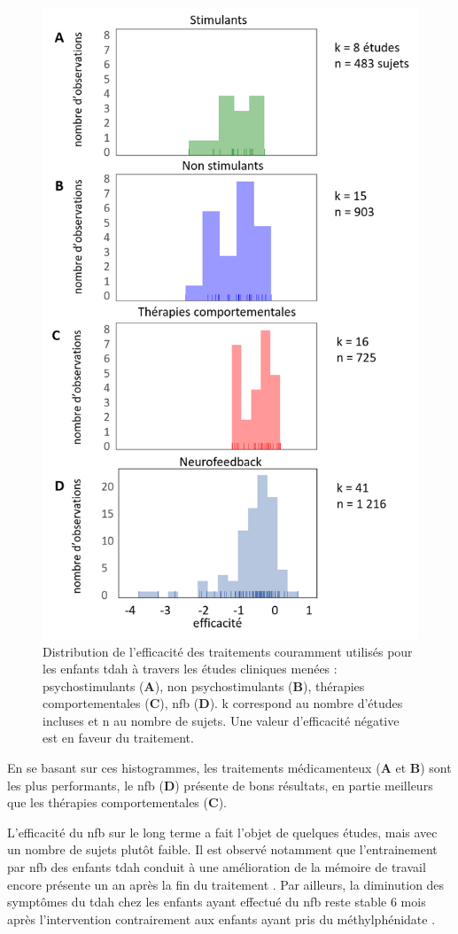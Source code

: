 \begin{figure}[h!]
  \centering
	\includegraphics[width=0.5\linewidth]{figures/chapter-1/introduction-efficacy-treatments} 
  \caption{Distribution de l'efficacité des traitements couramment utilisés pour les enfants \gls{tdah} à travers les études cliniques menées : 
	psychostimulants (\textbf{A}), non psychostimulants (\textbf{B}), thérapies comportementales (\textbf{C}), \gls{nfb} (\textbf{D}). k correspond au nombre
	d'études incluses et n au nombre de sujets. 
	Une valeur d'efficacité négative est en faveur du traitement.}
  \label{Figure:introduction-efficacy-treatments}
\end{figure}

En se basant sur ces histogrammes, les traitements médicamenteux (\textbf{A} et \textbf{B}) sont les plus performants, le \gls{nfb} (\textbf{D}) présente de bons
résultats, en partie meilleurs que les thérapies comportementales (\textbf{C}). 

L'efficacité du \gls{nfb} sur le long terme a fait l'objet de quelques études, mais avec un nombre de sujets plutôt faible. Il est observé notamment
que l'entrainement par \gls{nfb} des enfants \gls{tdah} conduit à une amélioration de la mémoire de travail encore présente un an après la fin du traitement
\citep{Dobrakowski2019}. Par ailleurs, la diminution des symptômes du \gls{tdah} chez les enfants ayant effectué du \gls{nfb} reste stable 6 mois après 
l'intervention contrairement aux enfants ayant pris du méthylphénidate \citep{Gelade2018}. 

